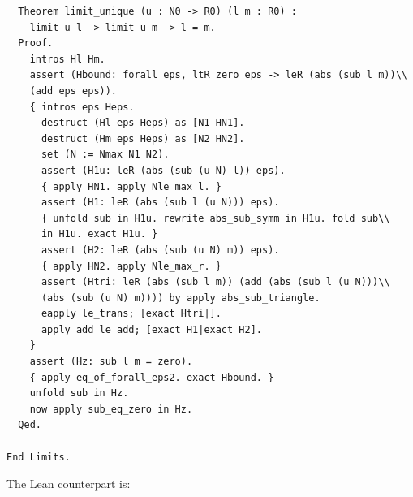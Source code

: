 \documentclass{article}
\begin{document}
\begin{verbatim}
  Theorem limit_unique (u : N0 -> R0) (l m : R0) :
    limit u l -> limit u m -> l = m.
  Proof.
    intros Hl Hm.
    assert (Hbound: forall eps, ltR zero eps -> leR (abs (sub l m))\\
    (add eps eps)).
    { intros eps Heps.
      destruct (Hl eps Heps) as [N1 HN1].
      destruct (Hm eps Heps) as [N2 HN2].
      set (N := Nmax N1 N2).
      assert (H1u: leR (abs (sub (u N) l)) eps).
      { apply HN1. apply Nle_max_l. }
      assert (H1: leR (abs (sub l (u N))) eps).
      { unfold sub in H1u. rewrite abs_sub_symm in H1u. fold sub\\
      in H1u. exact H1u. }
      assert (H2: leR (abs (sub (u N) m)) eps).
      { apply HN2. apply Nle_max_r. }
      assert (Htri: leR (abs (sub l m)) (add (abs (sub l (u N)))\\
      (abs (sub (u N) m)))) by apply abs_sub_triangle.
      eapply le_trans; [exact Htri|].
      apply add_le_add; [exact H1|exact H2].
    }
    assert (Hz: sub l m = zero).
    { apply eq_of_forall_eps2. exact Hbound. }
    unfold sub in Hz.
    now apply sub_eq_zero in Hz.
  Qed.

End Limits.
\end{verbatim}

The Lean counterpart is:
\end{document}
